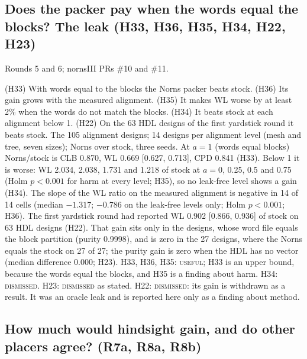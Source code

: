\subsection{Does the packer pay when the words equal the blocks? The leak (H33, H36, H35, H34, H22, H23)}
\label{sec:e-leak}

 Rounds 5 and 6; nornsIII PRs \#10 and \#11.

 (H33) With words equal to the blocks the Norns packer beats stock. (H36) Its gain grows with the measured alignment. (H35) It makes WL worse by at least 2\% when the words do not match the blocks. (H34) It beats stock at each alignment below 1. (H22) On the 63 HDL designs of the first yardstick round it beats stock.
 The 105 alignment designs; 14 designs per alignment level (mesh and tree, seven sizes); Norns over stock, three seeds.
 At $a=1$ (words equal blocks) Norns/stock is CLB 0.870, WL 0.669 [0.627, 0.713], CPD 0.841 (H33). %
Below 1 it is worse: WL 2.034, 2.038, 1.731 and 1.218 of stock at $a=0$, 0.25, 0.5 and 0.75 (Holm $p<0.001$ for harm at every level; H35), so no leak-free level shows a gain (H34). %
The slope of the WL ratio on the measured alignment is negative in 14 of 14 cells (median $-1.317$; $-0.786$ on the leak-free levels only; Holm $p<0.001$; H36). %
The first yardstick round had reported WL 0.902 [0.866, 0.936] of stock on 63 HDL designs (H22). %
That gain sits only in the  designs, whose word file equals the block partition (purity 0.9998), and is zero in the 27  designs, where the Norns  equals the stock  on 27 of 27; the purity gain is zero when the HDL has no vector (median difference 0.000; H23). %
 H33, H36, H35: \textsc{useful}; H33 is an upper bound, because the words equal the blocks, and H35 is a finding about harm. H34: \textsc{dismissed}. H23: \textsc{dismissed} as stated. H22: \textsc{dismissed}: its gain is withdrawn as a result. It was an oracle leak and is reported here only as a finding about method.

\subsection{How much would hindsight gain, and do other placers agree? (R7a, R8a, R8b)}
\label{sec:e-hind}

